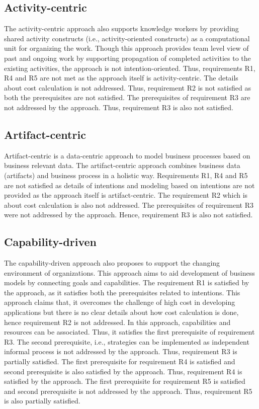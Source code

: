 \subsection{Activity-centric} 
The activity-centric approach also supports knowledge workers by providing shared activity constructs (i.e., activity-oriented constructs) as a computational unit for organizing the work. Though this approach provides team level view of past and ongoing work by supporting propagation of completed activities to the existing activities, the approach is not intention-oriented. Thus, requirements R1, R4 and R5 are not met as the approach itself is activity-centric. The details about cost calculation is not addressed. Thus, requirement R2 is not satisfied as both the prerequisites are not satisfied. The prerequisites of requirement R3 are not addressed by the approach. Thus, requirement R3 is also not satisfied.   
 
\subsection{Artifact-centric} 
Artifact-centric is a data-centric approach to model business processes based on business relevant data. The artifact-centric approach combines business data (artifacts) and business process in a holistic way. Requirements R1, R4 and R5 are not satisfied as details of intentions and modeling based on intentions are not provided as the approach itself is artifact-centric. The requirement R2 which is about cost calculation is also not addressed. The prerequisites of requirement R3 were not addressed by the approach. Hence, requirement R3 is also not satisfied. 

\subsection{Capability-driven} 
The capability-driven approach also proposes to support the changing environment of organizations. This approach aims to aid development of business models by connecting goals and capabilities. The requirement R1 is satisfied by the approach, as it satisfies both the prerequisites related to intentions. This approach claims that, it overcomes the challenge of high cost in developing applications but there is no clear details about how cost calculation is done, hence requirement R2 is not addressed. In this approach, capabilities and resources can be associated. Thus, it satisfies the first prerequisite of requirement R3. The second prerequisite, i.e., strategies can be implemented as independent informal process is not addressed by the approach. Thus, requirement R3 is partially satisfied. The first prerequisite for requirement R4 is satisfied and second prerequisite is also satisfied by the approach. Thus, requirement R4 is satisfied by the approach. The first prerequisite for requirement R5 is satisfied and second prerequisite is not addressed by the approach. Thus, requirement R5 is also partially satisfied. 

